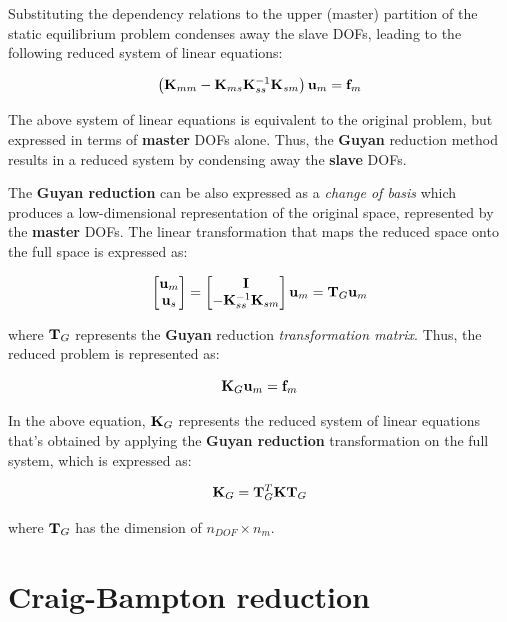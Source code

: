 Substituting the dependency relations to the upper (master) partition of the static
equilibrium problem condenses away the slave DOFs, leading to the following reduced
system of linear equations:

\begin{equation}
    \left(\mathbf{K}_{mm} - \mathbf{K}_{ms} \mathbf{K}_{ss}^{-1} \mathbf{K}_{sm} \right)
    \mathbf{u}_m = \mathbf{f}_m
\end{equation}

The above system of linear equations is equivalent to the original problem, but expressed
in terms of \textbf{master} DOFs alone. Thus, the \textbf{Guyan} reduction method
results in a reduced system by condensing away the \textbf{slave} DOFs.

The \textbf{Guyan reduction} can be also expressed as a \textit{change of basis} which
produces a low-dimensional representation of the original space, represented by the
\textbf{master} DOFs. The linear transformation that maps the reduced space onto
the full space is expressed as:

\begin{equation}
    \begin{bmatrix}
        \mathbf{u}_m \\
        \mathbf{u}_s
    \end{bmatrix} =
    \begin{bmatrix}
        \mathbf{I} \\
        -\mathbf{K}_{ss}^{-1} \mathbf{K}_{sm}
    \end{bmatrix}
    \mathbf{u}_m = \mathbf{T}_G \mathbf{u}_m
\end{equation}

where $ \mathbf{T}_G $ represents the \textbf{Guyan} reduction \textit{transformation matrix}.
Thus, the reduced problem is represented as:

\begin{equation}
    \mathbf{K}_G \mathbf{u}_m = \mathbf{f}_m
\end{equation}

In the above equation, $ \mathbf{K}_G $ represents the reduced system of linear equations
that's obtained by applying the \textbf{Guyan reduction} transformation on the
full system, which is expressed as:

\begin{equation}
    \mathbf{K}_G = \mathbf{T}_G^T \mathbf{K} \mathbf{T}_G
\end{equation}

where $ \mathbf{T}_G $ has the dimension of $ n_{DOF} \times n_m $.


\section{Craig-Bampton reduction}

